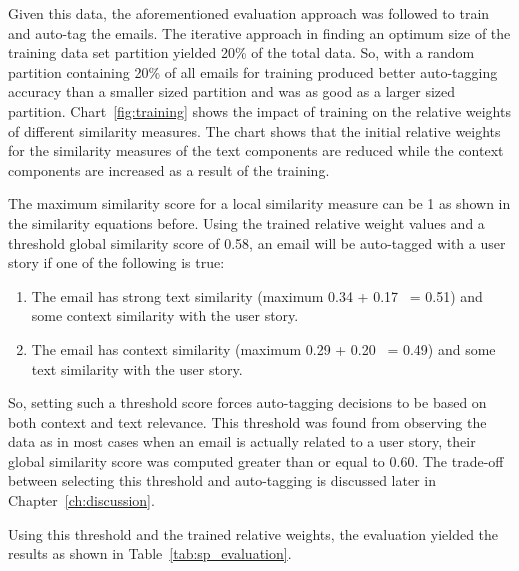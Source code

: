 Given this data, the aforementioned evaluation approach was followed to train and auto-tag the emails. The iterative approach in finding an optimum size of the training data set partition yielded 20\% of the total data. So, with a random partition containing 20\% of all emails for training produced better auto-tagging accuracy than a smaller sized partition and was as good as a larger sized partition. Chart~\ref{fig:training} shows the impact of training on the relative weights of different similarity measures. The chart shows that the initial relative weights for the similarity measures of the text components are reduced while the context components are increased as a result of the training.

The maximum similarity score for a local similarity measure can be 1 as shown in the similarity equations before. Using the trained relative weight values and a threshold global similarity score of 0.58, an email will be auto-tagged with a user story if one of the following is true:
\begin{enumerate}
	\item The email has strong text similarity (maximum 0.34 + 0.17 ~= 0.51) and some context similarity with the user story.
	\item The email has context similarity (maximum 0.29 + 0.20 ~= 0.49) and some text similarity with the user story.
\end{enumerate}
So, setting such a threshold score forces auto-tagging decisions to be based on both context and text relevance. This threshold was found from observing the data as in most cases when an email is actually related to a user story, their global similarity score was computed greater than or equal to 0.60. The trade-off between selecting this threshold and auto-tagging is discussed later in Chapter~\ref{ch:discussion}.

Using this threshold and the trained relative weights, the evaluation yielded the results as shown in Table~\ref{tab:sp_evaluation}.

